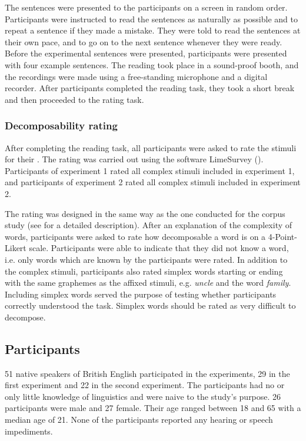 The sentences were presented to the participants on a screen in random order. 
Participants were instructed to read the sentences as naturally as possible and to repeat a sentence if they made a mistake. They were told to read the sentences at their own pace, and to go on to the next sentence whenever they were ready. Before the experimental sentences were presented, participants were presented with four example sentences. 
The reading took place in a sound-proof booth, and the recordings were made using a free-standing microphone and a digital recorder.
 After participants completed the reading task, they took a short break and then proceeded to the rating task.




\subsubsection{Decomposability rating}


After completing the reading task, all participants were asked to rate the stimuli for their . The rating was carried out using the software LimeSurvey (\citealt{LimeSurveyProjectTeam.2015}). Participants of experiment 1 rated all complex stimuli included in experiment 1, and participants of experiment 2 rated all complex stimuli included in experiment 2. 

The rating was designed in the same way as the one conducted for the corpus study (see  for a detailed description). After an explanation of the complexity of words, participants were asked to rate how decomposable a word is on a 4-Point-Likert scale. Participants were able to indicate that they did not know a word, i.e. only words which are known by the participants were rated. In addition to the complex stimuli, participants also rated simplex words starting or ending with the same graphemes as the affixed stimuli, e.g. \textit{{un}cle} and the word \textit{fami{ly}}. Including simplex words served the purpose of testing whether participants correctly understood the task. Simplex words should be rated as very difficult to decompose. 





	
	\subsection{Participants}
	
51 native speakers of British English participated in the experiments, 29 in the first experiment and 22 in the second experiment. The participants had no or only little knowledge of linguistics and were naive to the study's purpose. 26 participants were male and 27 female. Their age ranged between 18 and 65 with a median age of 21. None of the participants reported any hearing or speech impediments.
	


